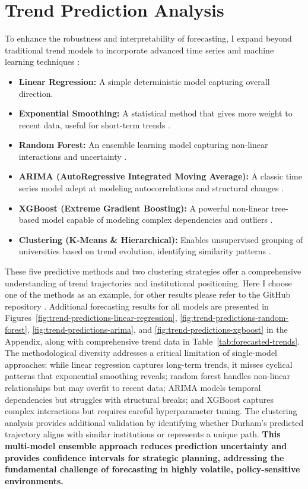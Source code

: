 \documentclass[journal,onecolumn, 10pt,draftclsnofoot]{IEEEtran}
\begin{document}
\section{Trend Prediction Analysis}

To enhance the robustness and interpretability of forecasting, I expand beyond traditional trend models to incorporate advanced time series and machine learning techniques \cite{box2015time,hamilton1994time}:

\begin{itemize}
    \item \textbf{Linear Regression:} A simple deterministic model capturing overall direction.
    \item \textbf{Exponential Smoothing:} A statistical method that gives more weight to recent data, useful for short-term trends \cite{hyndman2018forecasting}.
    \item \textbf{Random Forest:} An ensemble learning model capturing non-linear interactions and uncertainty \cite{breiman2001random}.
    \item \textbf{ARIMA (AutoRegressive Integrated Moving Average):} A classic time series model adept at modeling autocorrelations and structural changes \cite{box2015time}.
    \item \textbf{XGBoost (Extreme Gradient Boosting):} A powerful non-linear tree-based model capable of modeling complex dependencies and outliers \cite{chen2016xgboost}.
    \item \textbf{Clustering (K-Means \& Hierarchical):} Enables unsupervised grouping of universities based on trend evolution, identifying similarity patterns \cite{macqueen1967methods,ward1963hierarchical}.
\end{itemize}

These five predictive methods and two clustering strategies offer a comprehensive understanding of trend trajectories and institutional positioning. Here I choose one of the methods as an example, for other results please refer to the GitHub repository \cite{hesa_he_bci_2024}. Additional forecasting results for all models are presented in Figures~\ref{fig:trend-predictions-linear-regression}, \ref{fig:trend-predictions-random-forest}, \ref{fig:trend-predictions-arima}, and \ref{fig:trend-predictions-xgboost} in the Appendix, along with comprehensive trend data in Table~\ref{tab:forecasted-trends}. The methodological diversity addresses a critical limitation of single-model approaches: while linear regression captures long-term trends, it misses cyclical patterns that exponential smoothing reveals; random forest handles non-linear relationships but may overfit to recent data; ARIMA models temporal dependencies but struggles with structural breaks; and XGBoost captures complex interactions but requires careful hyperparameter tuning. The clustering analysis provides additional validation by identifying whether Durham's predicted trajectory aligns with similar institutions or represents a unique path. \textbf{This multi-model ensemble approach reduces prediction uncertainty and provides confidence intervals for strategic planning, addressing the fundamental challenge of forecasting in highly volatile, policy-sensitive environments.}
\end{document}
